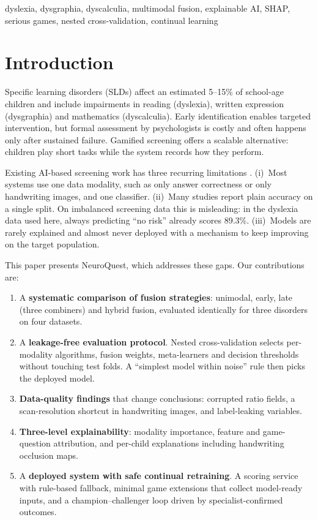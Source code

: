 \documentclass[conference]{IEEEtran}
\begin{document}
\begin{IEEEkeywords}
dyslexia, dysgraphia, dyscalculia, multimodal fusion, explainable AI, SHAP, serious games, nested cross-validation, continual learning
\end{IEEEkeywords}

\section{Introduction}
Specific learning disorders (SLDs) affect an estimated 5--15\% of school-age children and include impairments in
reading (dyslexia), written expression (dysgraphia) and mathematics (dyscalculia). Early identification enables
targeted intervention, but formal assessment by psychologists is costly and often happens only after sustained
failure. Gamified screening offers a scalable alternative: children play short tasks while the system records how
they perform.

Existing AI-based screening work has three recurring limitations
\cite{bhushan2024survey,fallah2025dysgraphia}. (i)~Most systems use one data modality, such as only answer
correctness or only handwriting images, and one classifier. (ii)~Many studies report plain accuracy on a single
split. On imbalanced screening data this is misleading: in the dyslexia data used here, always predicting ``no risk''
already scores 89.3\%. (iii)~Models are rarely explained and almost never deployed with a mechanism to keep improving
on the target population.

This paper presents NeuroQuest, which addresses these gaps. Our contributions are:
\begin{enumerate}
  \item A \textbf{systematic comparison of fusion strategies}: unimodal, early, late (three combiners) and hybrid fusion,
        evaluated identically for three disorders on four datasets.
  \item A \textbf{leakage-free evaluation protocol}. Nested cross-validation selects per-modality algorithms, fusion
        weights, meta-learners and decision thresholds without touching test folds. A ``simplest model within noise''
        rule then picks the deployed model.
  \item \textbf{Data-quality findings} that change conclusions: corrupted ratio fields, a scan-resolution shortcut in
        handwriting images, and label-leaking variables.
  \item \textbf{Three-level explainability}: modality importance, feature and game-question attribution, and
        per-child explanations including handwriting occlusion maps.
  \item A \textbf{deployed system with safe continual retraining}. A scoring service with rule-based fallback, minimal
        game extensions that collect model-ready inputs, and a champion--challenger loop driven by specialist-confirmed
        outcomes.
\end{enumerate}
\end{document}
